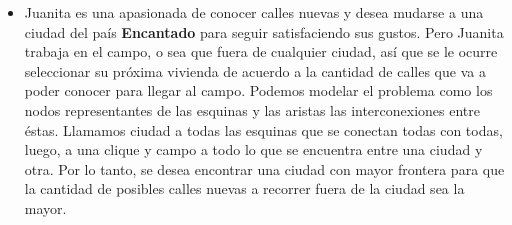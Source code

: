 \begin{itemize}
\item Juanita es una apasionada de conocer calles nuevas y desea mudarse a una ciudad del país \textbf{Encantado} para seguir satisfaciendo sus gustos. Pero Juanita trabaja en el campo, o sea que fuera de cualquier ciudad, así que se le ocurre seleccionar su próxima vivienda de acuerdo a la cantidad de calles que va a poder conocer para llegar al campo. Podemos modelar el problema como los nodos representantes de las esquinas y las aristas las interconexiones entre éstas. Llamamos ciudad a todas las esquinas que se conectan todas con todas, luego, a una clique y campo a todo lo que se encuentra entre una ciudad y otra. Por lo tanto, se desea encontrar una ciudad con mayor frontera para que la cantidad de posibles calles nuevas a recorrer fuera de la ciudad sea la mayor.

\end{itemize}
